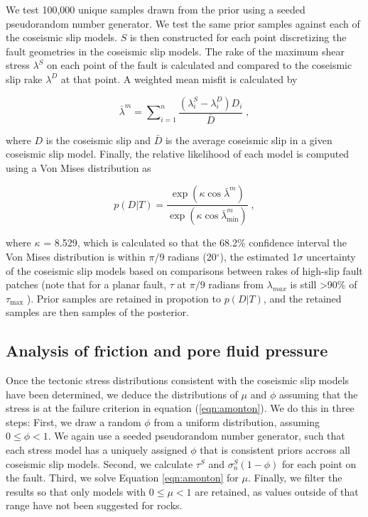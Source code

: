 \documentclass[twocolumn,jgrga]{AGUTeX}
\begin{document}
\begin{article}
We test 100,000 unique samples drawn from the prior using a seeded
pseudorandom number generator. We test the same prior samples against
each of the coseismic slip models. $S$ is then constructed for each
point discretizing the fault geometries in the coseismic slip models.
The rake of the maximum shear stress $\lambda^S$ on each point of the
fault is calculated and compared to the coseismic slip rake $\lambda^D$
at that point. A weighted mean misfit is calculated by

\begin{equation}
\bar{\lambda}^m = \sum \nolimits_{i=1}^n \frac{(\lambda^S_i - \lambda^D_i) D_i} 
{\bar{ D}} \; ,
\label{eqn:rake_misfit}
\end{equation}

where $D$ is the coseismic slip and $\bar{D}$ is the average coseismic
slip in a given coseismic slip model. Finally, the relative likelihood
of each model is computed using a Von Mises distribution as

\begin{equation}
p (D | T) = \frac{ \exp ( \kappa \cos \bar{\lambda}^m )} 
{\exp (\kappa \cos \bar{\lambda}^m_{\min})} \;,
\label{eqn:rel_likelihood}
\end{equation}

where $\kappa$ = 8.529, which is calculated so that the 68.2\%
confidence interval the Von Mises distribution is within $\pi$/9 radians
(20$^{\circ}$), the estimated 1$\sigma$ uncertainty of the coseismic
slip models based on comparisons between rakes of high-slip fault
patches (note that for a planar fault, $\tau$ at $\pi/9$ radians from
$\lambda_{max}$ is still \textgreater{}90\% of $\tau_{\mathrm{\max}}$
\citep{lisle2013}). Prior samples are retained in propotion to $p(D|T)$,
and the retained samples are then samples of the posterior.

\subsection{Analysis of friction and pore fluid
pressure}\label{analysis-of-friction-and-pore-fluid-pressure}

Once the tectonic stress distributions consistent with the coseismic
slip models have been determined, we deduce the distributions of $\mu$
and $\phi$ assuming that the stress is at the failure criterion in
equation (\ref{eqn:amonton}). We do this in three steps: First, we draw
a random $\phi$ from a uniform distribution, assuming $0 \leq \phi < 1$.
We again use a seeded pseudorandom number generator, such that each
stress model has a uniquely assigned $\phi$ that is consistent priors
accross all coseismic slip models. Second, we calculate $\tau^S$ and
$\sigma_n^S(1-\phi)$ for each point on the fault. Third, we solve
Equation \ref{eqn:amonton} for $\mu$. Finally, we filter the results so
that only models with $0 \le \mu < 1$ are retained, as values outside of
that range have not been suggested for rocks.


\end{article}
\end{document}
